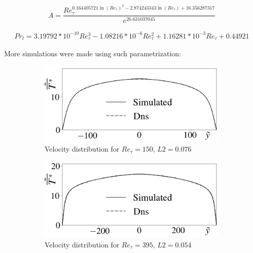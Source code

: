 \documentclass[10pt]{article} %
\begin{document}
\begin{equation}
A = \frac{Re_\tau ^{0.164405721 \ln(Re_\tau)^2 - 2.874243343 \ln(Re_\tau) +  16.356287317 } }{e ^{26.631037045}}
\end{equation}

\begin{equation}
\begin{split}
Pr_t = 3.19792 * 10^{-10} Re_\tau^3 - 1.08216 * 10^{-6} Re_\tau^2 + 1.16281 *10 ^{-3} Re_\tau + 0.44921 
\end{split}
\end{equation}

More simulations were made using such parametrization:

\begin{figure}[!h]
	\centering
	\begin{subfigure}[t]{0.5\textwidth}
		\centering
		\includegraphics[angle=0, scale=0.24]{fotos_formatacao_final/Temperature_150_071_Genetic}
		\caption{Velocity distribution for $Re_\tau = 150$, $L2 = 0.076$}
	\end{subfigure}
	\begin{subfigure}[t]{0.45\textwidth}
		\centering
		\includegraphics[angle=0, scale=0.24]{fotos_formatacao_final/Temperature_395_071_Genetic}
		\caption{Velocity distribution for $Re_\tau = 395$, $L2 = 0.054$}
	\end{subfigure}
	\begin{subfigure}[t]{0.5\textwidth}

\end{subfigure}
\end{figure}
\end{document}
